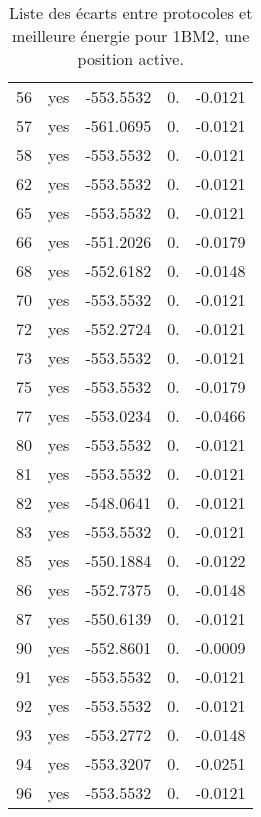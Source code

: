 \begin{table}[h]
{\begin{tabular}{ccccc}
        56 & yes &  -553.5532 &  0. & -0.0121 \\
        57 & yes &  -561.0695 &  0. & -0.0121 \\
        58 & yes &  -553.5532 &  0. & -0.0121 \\
        62 & yes &  -553.5532 &  0. & -0.0121 \\
        65 & yes &  -553.5532 &  0. & -0.0121 \\
        66 & yes &  -551.2026 &  0. & -0.0179 \\
        68 & yes &  -552.6182 &  0. & -0.0148 \\
        70 & yes &  -553.5532 &  0. & -0.0121 \\
        72 & yes &  -552.2724 &  0. & -0.0121 \\
        73 & yes &  -553.5532 &  0. & -0.0121 \\
        75 & yes &  -553.5532 &  0. & -0.0179 \\
        77 & yes &  -553.0234 &  0. & -0.0466 \\
        80 & yes &  -553.5532 &  0. & -0.0121 \\
        81 & yes &  -553.5532 &  0. & -0.0121 \\
        82 & yes &  -548.0641 &  0. & -0.0121 \\
        83 & yes &  -553.5532 &  0. & -0.0121 \\
        85 & yes &  -550.1884 &  0. & -0.0122 \\
        86 & yes &  -552.7375 &  0. & -0.0148 \\
        87 & yes &  -550.6139 &  0. & -0.0121 \\
        90 & yes &  -552.8601 &  0. & -0.0009 \\
        91 & yes &  -553.5532 &  0. & -0.0121 \\
        92 & yes &  -553.5532 &  0. & -0.0121 \\
        93 & yes &  -553.2772 &  0. & -0.0148 \\
        94 & yes &  -553.3207 &  0. & -0.0251 \\
        96 & yes &  -553.5532 &  0. & -0.0121 \\
        \bottomrule

      \end{tabular}
}      
      \caption{Liste des écarts entre protocoles et meilleure énergie pour 1BM2, une position active.}
\label{tab:result_1_active_1BM2}      
    \end{table}





